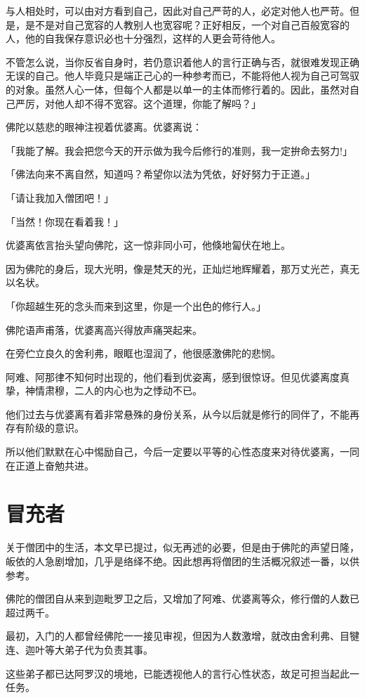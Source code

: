 \documentclass[twoside,openany]{book}
\begin{document}
与人相处时，可以由对方看到自己，因此对自己严苛的人，必定对他人也严苛。但是，是不是对自己宽容的人教别人也宽容呢？正好相反，一个对自己百般宽容的人，他的自我保存意识必也十分强烈，这样的人更会苛待他人。

不管怎么说，当你反省自身时，若仍意识着他人的言行正确与否，就很难发现正确无误的自己。他人毕竟只是端正己心的一种参考而已，不能将他人视为自己可驾驭的对象。虽然人心一体，但每个人都是以单一的主体而修行着的。因此，虽然对自己严厉，对他人却不得不宽容。这个道理，你能了解吗？」

佛陀以慈悲的眼神注视着优婆离。优婆离说：

「我能了解。我会把您今天的开示做为我今后修行的准则，我一定拚命去努力!」

「佛法向来不离自然，知道吗？希望你以法为凭依，好好努力于正道。」

「请让我加入僧团吧！」

「当然！你现在看着我！」

优婆离依言抬头望向佛陀，这一惊非同小可，他倏地匐伏在地上。

因为佛陀的身后，现大光明，像是梵天的光，正灿烂地辉耀着，那万丈光芒，真无以名状。

「你超越生死的念头而来到这里，你是一个出色的修行人。」

佛陀语声甫落，优婆离高兴得放声痛哭起来。

在旁伫立良久的舍利弗，眼眶也湿润了，他很感激佛陀的悲悯。

阿难、阿那律不知何时出现的，他们看到优姿离，感到很惊讶。但见优婆离度真挚，神情肃穆，二人的内心也为之悸动不已。

他们过去与优婆离有着非常悬殊的身份关系，从今以后就是修行的同伴了，不能再存有阶级的意识。

所以他们默默在心中惕励自己，今后一定要以平等的心性态度来对待优婆离，一同在正道上奋勉共进。

\section{冒充者}\label{sec9.4}

关于僧团中的生活，本文早已提过，似无再述的必要，但是由于佛陀的声望日隆，皈依的人急剧增加，几乎是络绎不绝。因此想再将僧团的生活概况叙述一番，以供参考。

佛陀的僧团自从来到迦毗罗卫之后，又增加了阿难、优婆离等众，修行僧的人数已超过两千。

最初，入门的人都曾经佛陀一一接见审视，但因为人数激增，就改由舍利弗、目犍连、迦叶等大弟子代为负责其事。

这些弟子都已达阿罗汉的境地，已能透视他人的言行心性状态，故足可担当起此一任务。
\end{document}
